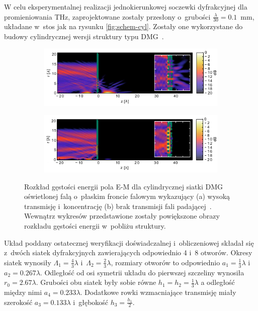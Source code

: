 W celu eksperymentalnej realizacji jednokierunkowej soczewki dyfrakcyjnej dla promieniowania THz, zaprojektowane zostały przesłony o~grubości $\frac{\lambda}{30}=0.1$~mm, układane w~stos jak na rysunku \ref{fig:schem-cyl}. Zostały one wykorzystane do budowy cylindrycznej wersji struktury typu DMG~\cite{Yavorskiy:14}. 
\begin{figure}[tb]
	\begin{subfigure}{\textwidth}
		\includegraphics[width=\textwidth]{images/dmg/express-high-kontrast-trans.png}
		\caption{}
	\end{subfigure}

	\begin{subfigure}{\textwidth}
		\includegraphics[width=\textwidth]{images/dmg/express-high-kontrast-block.png}
		\caption{}
	\end{subfigure}
	\caption{Rozkład gęstości energii pola E-M dla cylindrycznej siatki DMG oświetlonej falą o~płaskim froncie falowym wykazujący (a) wysoką transmisję i~koncentrację (b) brak transmisji fali padającej~\cite{Yavorskiy:14}. Wewnątrz wykresów przedstawione zostały powiększone obrazy rozkładu gęstości energii w~pobliżu struktury.}
	\label{fig:cyl-gest-ene}
\end{figure}

Układ poddany ostatecznej weryfikacji doświadczalnej i~obliczeniowej składał się z~dwóch siatek dyfrakcyjnych zawierających odpowiednio 4 i~8 otworów. Okresy siatek wynosiły $\Lambda_1=\frac{4}{3} \lambda$ i~$\Lambda_2=\frac{2}{3} \lambda$, rozmiary otworów to odpowiednio $a_1=\frac{1}{3}\lambda$ i~$a_2=0.267 \lambda$. Odległość od osi symetrii układu do pierwszej szczeliny wynosiła $r_0=2.67\lambda$. Grubości obu siatek były sobie równe $h_1=h_2=\frac{1}{3}\lambda$ a odległość między nimi $a_4=0.233\lambda$. Dodatkowe rowki wzmacniające transmisję miały szerokość $a_3=0.133\lambda$ i~głębokość $h_3=\frac{h_1}{2}$. 

